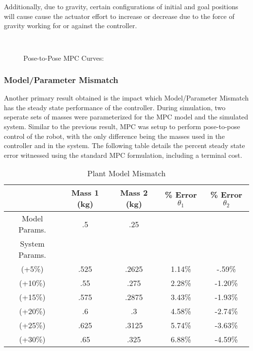 \documentclass[journal]{IEEEtran}
\begin{document}
 Additionally, due to gravity, certain configurations of initial and goal positions will cause cause the actuator effort to increase or decrease due to the force of gravity working for or against the controller. \\

\begin{figure}[ht]%
    \centering
    \\
    \caption{Pose-to-Pose MPC Curves:}%
    \label{fig:pose2pose_control_action}%
\end{figure}


\subsubsection{Model/Parameter Mismatch}

Another primary result obtained is the impact which Model/Parameter Mismatch has the steady state performance of the controller. During simulation, two seperate sets of masses were parameterized for the MPC model and the simulated system. Similar to the previous result, MPC was setup to perform pose-to-pose control of the robot, with the only difference being the masses used in the controller and in the system. The following table details the percent steady state error witnessed using the standard MPC formulation, including a terminal cost.\\

\begin{table}[ht]\caption{Plant Model Mismatch}
    \centering
    \begin{tabular}{c c c c c}
          & Mass 1 (kg) & Mass 2 (kg) & \% Error $\theta_1$ & \% Error $\theta_2$  \\
        \hline\hline

        Model Params. & .5 & .25 & &  \\
        \hline
        System Params. &  & & &  \\
        \hline
        (+5\%)  & .525 & .2625 & 1.14\% & -.59\%   \\
        (+10\%) & .55 & .275 & 2.28\% & -1.20\% \\
        (+15\%) & .575 & .2875 & 3.43\% & -1.93\% \\
        (+20\%) & .6 & .3 & 4.58\% & -2.74\% \\
        (+25\%) & .625 & .3125 & 5.74\% & -3.63\% \\
        (+30\%) & .65 & .325 & 6.88\% & -4.59\% \\ [1ex]

    \end{tabular}
    \label{table:mismatch}
\end{table}
\end{document}
